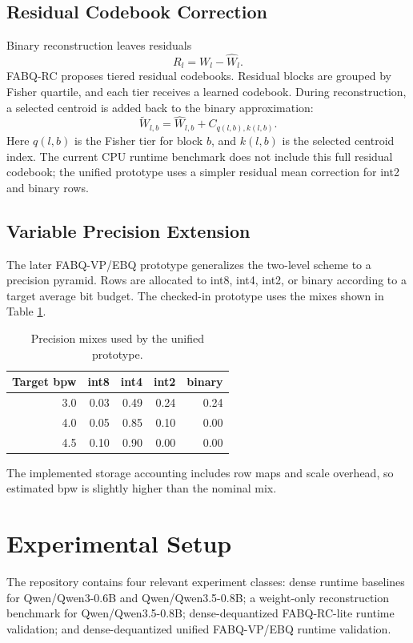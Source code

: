 \documentclass[11pt]{article}
\begin{document}
\subsection{Residual Codebook Correction}

Binary reconstruction leaves residuals
\[
R_l = W_l - \hat{W}_l.
\]
FABQ-RC proposes tiered residual codebooks. Residual blocks are grouped by Fisher quartile, and each tier receives a learned codebook. During reconstruction, a selected centroid is added back to the binary approximation:
\[
\tilde{W}_{l,b} = \hat{W}_{l,b} + C_{q(l,b), k(l,b)}.
\]
Here \(q(l,b)\) is the Fisher tier for block \(b\), and \(k(l,b)\) is the selected centroid index. The current CPU runtime benchmark does not include this full residual codebook; the unified prototype uses a simpler residual mean correction for int2 and binary rows.

\subsection{Variable Precision Extension}

The later FABQ-VP/EBQ prototype generalizes the two-level scheme to a precision pyramid. Rows are allocated to int8, int4, int2, or binary according to a target average bit budget. The checked-in prototype uses the mixes shown in Table \ref{tab:mixes}.

\begin{table}[h]
\centering
\begin{tabular}{rrrrr}
\toprule
Target bpw & int8 & int4 & int2 & binary \\
\midrule
3.0 & 0.03 & 0.49 & 0.24 & 0.24 \\
4.0 & 0.05 & 0.85 & 0.10 & 0.00 \\
4.5 & 0.10 & 0.90 & 0.00 & 0.00 \\
\bottomrule
\end{tabular}
\caption{Precision mixes used by the unified prototype.}
\label{tab:mixes}
\end{table}

The implemented storage accounting includes row maps and scale overhead, so estimated bpw is slightly higher than the nominal mix.

\section{Experimental Setup}

The repository contains four relevant experiment classes: dense runtime baselines for Qwen/Qwen3-0.6B and Qwen/Qwen3.5-0.8B; a weight-only reconstruction benchmark for Qwen/Qwen3.5-0.8B; dense-dequantized FABQ-RC-lite runtime validation; and dense-dequantized unified FABQ-VP/EBQ runtime validation.
\end{document}
